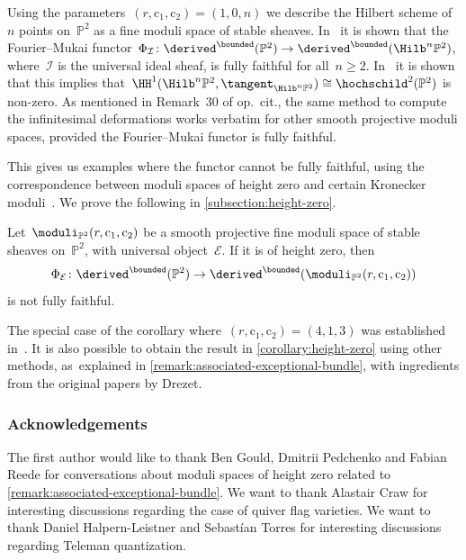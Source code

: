 Using the parameters~$(r,\mathrm{c}_1,\mathrm{c}_2)=(1,0,n)$
we describe the Hilbert scheme of~$n$ points on~$\mathbb{P}^2$
as a fine moduli space of stable sheaves.
In~\cite[Th.\,1.2]{MR3397451} it is shown that the Fourier--Mukai functor~$\Phi_{\mathcal{I}}\colon\derived^\bounded(\mathbb{P}^2)\to\derived^\bounded(\Hilb^n\mathbb{P}^2)$,
where~$\mathcal{I}$ is the universal ideal sheaf,
is fully faithful for all~$n\geq 2$.
In~\cite[Prop.\,29]{MR3950704} it is shown that this implies that~$\HH^1(\Hilb^n\mathbb{P}^2,\tangent_{\Hilb^n\mathbb{P}^2})\cong\hochschild^2(\mathbb{P}^2)$ is non-zero.
As mentioned in Remark~30 of op.~cit.,
the same method to compute the infinitesimal deformations
works verbatim for other smooth projective moduli spaces,
provided the Fourier--Mukai functor is fully faithful.

This gives us examples where the functor cannot be fully faithful,
using the correspondence between moduli spaces of height zero
and certain Kronecker moduli~\cite[Th.\,2]{MR0916199}.
We prove the following in \cref{subsection:height-zero}.

\begin{alphacorollary}
\label{corollary:height-zero}
Let~$\moduli_{\mathbb{P}^2}(r,\mathrm{c}_1,\mathrm{c}_2)$ be a smooth projective
fine moduli space of stable sheaves on~$\mathbb{P}^2$,
with universal object~$\mathcal{E}$.
If it is of height zero,
then
\begin{equation}
\label{equation:height-zero-functor}
\Phi_{\mathcal{E}}\colon\derived^\bounded(\mathbb{P}^2)\to\derived^\bounded(\moduli_{\mathbb{P}^2}(r,\mathrm{c}_1,\mathrm{c}_2))
\end{equation}
is not fully faithful.
\end{alphacorollary}

The special case of the corollary where~$(r,\mathrm{c}_1,\mathrm{c}_2)=(4,1,3)$
was established in~\cite{MR4223526}.
It is also possible to obtain the result in \cref{corollary:height-zero} using other methods, as~explained in \cref{remark:associated-exceptional-bundle},
with ingredients from the original papers by Drezet.

\subsubsection*{Acknowledgements}

The first author would like to thank Ben Gould, Dmitrii Pedchenko and Fabian Reede
for conversations about moduli spaces of height zero
related to \cref{remark:associated-exceptional-bundle}.
We want to thank Alastair Craw for interesting discussions regarding the case of quiver flag varieties.
We want to thank Daniel Halpern-Leistner and Sebastían Torres for interesting discussions
regarding Teleman quantization.


